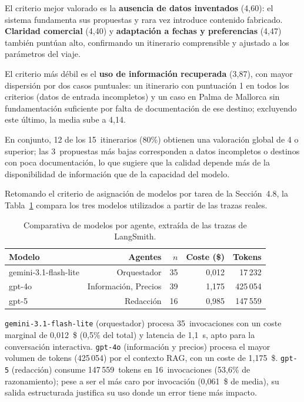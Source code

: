 El criterio mejor valorado es la \textbf{ausencia de datos inventados} (4{,}60): el sistema fundamenta sus propuestas y rara vez introduce contenido fabricado. \textbf{Claridad comercial} (4{,}40) y \textbf{adaptación a fechas y preferencias} (4{,}47) también puntúan alto, confirmando un itinerario comprensible y ajustado a los parámetros del viaje.

El criterio más débil es el \textbf{uso de información recuperada} (3{,}87), con mayor dispersión por dos casos puntuales: un itinerario con puntuación 1 en todos los criterios (datos de entrada incompletos) y un caso en Palma de Mallorca sin fundamentación suficiente por falta de documentación de ese destino; excluyendo este último, la media sube a 4{,}14.

En conjunto, 12 de los 15~itinerarios (80\%) obtienen una valoración global de 4 o superior; las 3~propuestas más bajas corresponden a datos incompletos o destinos con poca documentación, lo que sugiere que la calidad depende más de la disponibilidad de información que de la capacidad del modelo.

Retomando el criterio de asignación de modelos por tarea de la Sección~4.8, la Tabla~\ref{tab:model-comparison} compara los tres modelos utilizados a partir de las trazas reales.

\begin{table}[htbp]
\centering
\fontsize{10}{12}\selectfont
\begin{tabular}{lrrrr}
\toprule
Modelo & Agentes & $n$ & Coste (\$) & Tokens \\
\midrule
gemini-3.1-flash-lite & Orquestador & 35 & 0{,}012 & 17\,232 \\
gpt-4o & Información, Precios & 39 & 1{,}175 & 425\,054 \\
gpt-5 & Redacción & 16 & 0{,}985 & 147\,559 \\
\bottomrule
\end{tabular}
\caption{Comparativa de modelos por agente, extraída de las trazas de LangSmith.}
\label{tab:model-comparison}
\end{table}

\texttt{gemini-3.1-flash-lite} (orquestador) procesa 35~invocaciones con un coste marginal de 0{,}012~\$ (0{,}5\% del total) y latencia de 1{,}1~s, apto para la conversación interactiva. \texttt{gpt-4o} (información y precios) procesa el mayor volumen de tokens (425\,054) por el contexto RAG, con un coste de 1{,}175~\$. \texttt{gpt-5} (redacción) consume 147\,559~tokens en 16~invocaciones (53{,}6\% de razonamiento); pese a ser el más caro por invocación (0{,}061~\$ de media), su salida estructurada justifica su uso donde un error tiene más impacto.

